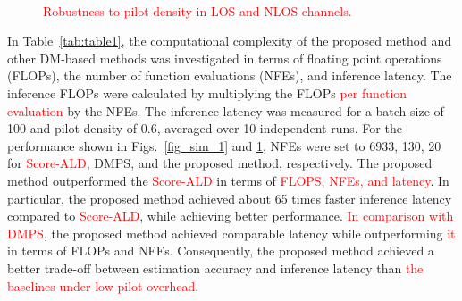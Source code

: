 \documentclass[lettersize,journal]{IEEEtran}
\newcommand{\tred}{\textcolor{red}}
\begin{document}
\begin{figure}[!t]
\\
\caption{\tred{Robustness to pilot density in LOS and NLOS channels.}}
\label{fig_sim_2}
\end{figure}

In Table~\ref{tab:table1}, the computational complexity of the proposed method and other DM-based methods was investigated in terms of floating point operations (FLOPs), the number of function evaluations (NFEs), and inference latency. The inference FLOPs were calculated by multiplying the FLOPs \tred{per function evaluation} by the NFEs. The inference latency was measured for a batch size of 100 and pilot density of 0.6, averaged over 10 independent runs. For the performance shown in Figs.~\ref{fig_sim_1} and \ref{fig_sim_2}, NFEs were set to 6933, 130, 20 for \tred{Score-ALD}, DMPS, and the proposed method, respectively. The proposed method outperformed the \tred{Score-ALD} in terms of \tred{FLOPS, NFEs, and latency}. In particular, the proposed method achieved about 65 times faster inference latency compared to \tred{Score-ALD}, while achieving better performance. \tred{In comparison with DMPS}, the proposed method achieved comparable latency while outperforming \tred{it} in terms of FLOPs and NFEs. Consequently, the proposed method achieved a better trade-off between estimation accuracy and inference latency than \tred{the baselines under low pilot overhead}.
\end{document}
